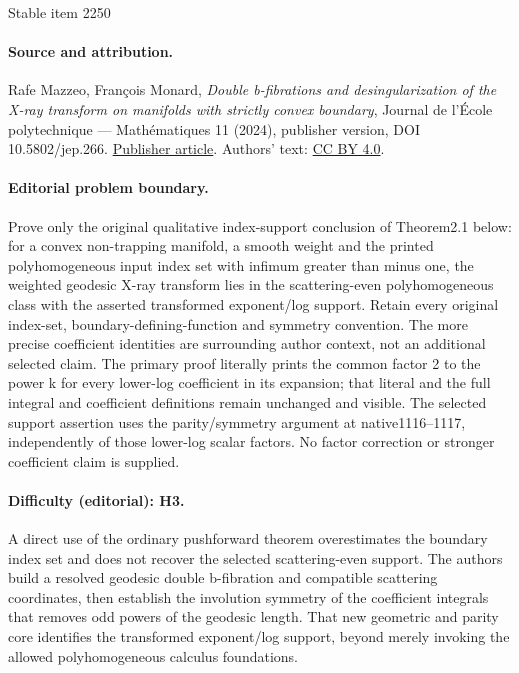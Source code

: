 \documentclass[11pt]{article}
\theoremstyle{plain}
\theoremstyle{definition}
\theoremstyle{remark}
\begin{document}
\begin{center}{\Large Stable item 2250}\end{center}
\paragraph{Source and attribution.}
Rafe Mazzeo, François Monard, \emph{Double b-fibrations and desingularization of the X-ray transform on manifolds with strictly convex boundary}, Journal de l’École polytechnique — Mathématiques 11 (2024), publisher version, DOI 10.5802/jep.266. \href{https://jep.centre-mersenne.org/articles/10.5802/jep.266/}{Publisher article}. Authors' text: \href{https://creativecommons.org/licenses/by/4.0/}{CC BY 4.0}.
\paragraph{Editorial problem boundary.}
Prove only the original qualitative index-support conclusion of Theorem2.1 below: for a convex non-trapping manifold, a smooth weight and the printed polyhomogeneous input index set with infimum greater than minus one, the weighted geodesic X-ray transform lies in the scattering-even polyhomogeneous class with the asserted transformed exponent/log support. Retain every original index-set, boundary-defining-function and symmetry convention. The more precise coefficient identities are surrounding author context, not an additional selected claim. The primary proof literally prints the common factor 2 to the power k for every lower-log coefficient in its expansion; that literal and the full integral and coefficient definitions remain unchanged and visible. The selected support assertion uses the parity/symmetry argument at native1116–1117, independently of those lower-log scalar factors. No factor correction or stronger coefficient claim is supplied.
\paragraph{Difficulty (editorial): H3.}
A direct use of the ordinary pushforward theorem overestimates the boundary index set and does not recover the selected scattering-even support. The authors build a resolved geodesic double b-fibration and compatible scattering coordinates, then establish the involution symmetry of the coefficient integrals that removes odd powers of the geodesic length. That new geometric and parity core identifies the transformed exponent/log support, beyond merely invoking the allowed polyhomogeneous calculus foundations.
\end{document}
